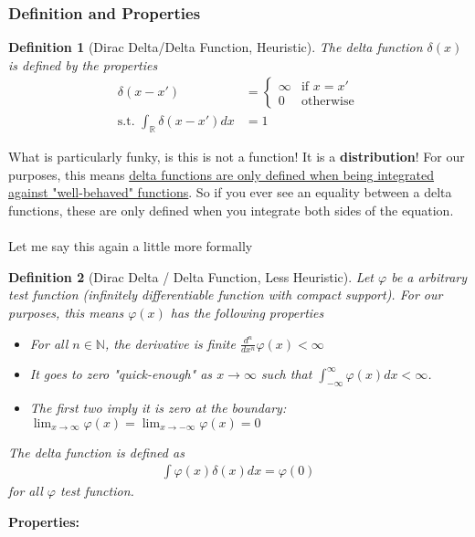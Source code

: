 \documentclass[12pt,fleqn]{article}
\numberwithin{equation}{section} %
\newtheorem{definition}{Definition}
\begin{document}
\subsubsection{Definition and Properties}
\begin{definition}
	[Dirac Delta/Delta Function, Heuristic] The delta function $\delta(x)$ is defined by the properties
	\begin{align}
		\delta(x-x') & = \begin{cases}
			\infty & \text{if } x = x'\\
			0 & \text{otherwise}
		\end{cases}\\
		\text{s.t. } \int_{\mathbb R} \delta(x-x')d x  & = 1
	\end{align}
\end{definition}
What is particularly funky, is this is not a function! It is a \textbf{distribution}! For our purposes, this means \underline{delta functions are only defined when being integrated against "well-behaved" functions}. So if you ever see an equality between a delta functions, these are only defined when you integrate both sides of the equation.\\
\\
Let me say this again a little more formally
\begin{definition}[Dirac Delta / Delta Function, Less Heuristic] Let $\varphi$ be a arbitrary test function (infinitely differentiable function with compact support). For our purposes, this means $\varphi(x)$ has the following properties
\begin{itemize}
	\item For all $n \in \mathbb N$, the derivative is finite $\frac{d^n}{dx^n}\varphi(x) < \infty$ 
	\item It goes to zero "quick-enough" as $x \to \infty$ such that $\int_{-\infty}^\infty \varphi(x) dx < \infty$.
	\item The first two imply it is zero at the boundary: $\lim_{x\to \infty} \varphi(x) = \lim_{x \to -\infty} \varphi(x) = 0$
\end{itemize}
The delta function is defined as
\begin{align}
	\int \varphi(x) \delta(x) dx = \varphi(0)
\end{align}
for all $\varphi$ test function.
\end{definition}
\textbf{Properties:}
\end{document}
